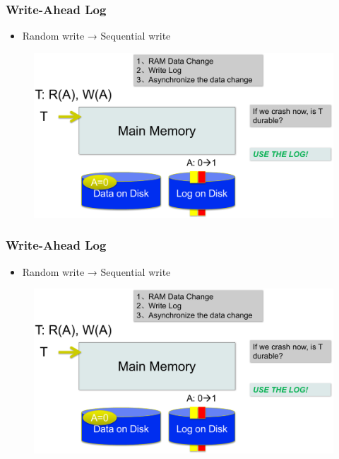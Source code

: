 \begin{frame}[fragile]
	\frametitle{Write-Ahead Log}
	\begin{itemize}
		\item Random write → Sequential write
	\end{itemize}
	\begin{figure}
		\includegraphics[width=.68\linewidth]{figs/dbfile-wal2.pdf}
	\end{figure}
\end{frame}

\begin{frame}[fragile]
	\frametitle{Write-Ahead Log}
	\begin{itemize}
		\item Random write → Sequential write
	\end{itemize}
	\begin{figure}
		\includegraphics[width=.68\linewidth]{figs/dbfile-wal2.pdf}
	\end{figure}
\end{frame}

